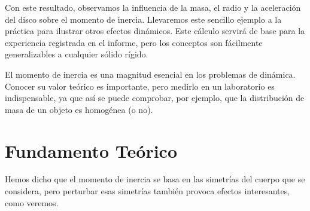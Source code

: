 \documentclass[a4paper]{article}
\begin{document}
Con este resultado, observamos la influencia de la masa, el radio y la aceleración del disco sobre el momento de inercia. Llevaremos este sencillo ejemplo a la práctica para ilustrar otros efectos dinámicos. Este cálculo servirá de base para la experiencia registrada en el informe, pero los conceptos son fácilmente generalizables a cualquier sólido rígido.

El momento de inercia es una magnitud esencial en los problemas de dinámica. Conocer su valor teórico es importante, pero medirlo en un laboratorio es indispensable, ya que así se puede comprobar, por ejemplo, que la distribución de masa de un objeto es homogénea (o no).

\section{Fundamento Teórico} \label{sec:fundamento}
Hemos dicho que el momento de inercia se basa en las simetrías del cuerpo que se considera, pero perturbar esas simetrías también provoca efectos interesantes, como veremos. 
\end{document}
